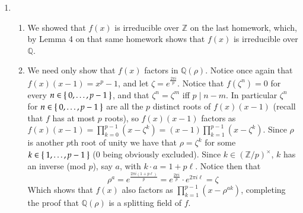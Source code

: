 \documentclass[12pt]{article}
\theoremstyle{definitionstyle}
\def\mbb#1{\mathbb{#1}}
\newcommand{\Z}{\mbb Z}
\newcommand{\Q}{\mbb Q}
\begin{document}
\begin{enumerate}[leftmargin=\labelsep]
		\item 
		\begin{enumerate}
			\item We showed that $f(x)$ is irreducible over $\Z$ on the last homework, which, by Lemma 4 on that same homework shows that $f(x)$ is irreducible over $\Q$. 
			\item We need only show that $f(x)$ factors in $\Q(\rho)$. Notice once again that $f(x)(x-1) = x^p - 1$, and let $\zeta = e^{\frac{2\pi i}{p}}$. Notice that $f(\zeta^n) = 0$ for every $n \in \Set{0, \ldots, p-1}$, and that $\zeta^n = \zeta^m$ iff $p \mid n-m$. In particular $\zeta^n$ for $n \in \Set{0, \ldots, p-1}$ are all the $p$ distinct roots of $f(x)(x-1)$ (recall that $f$ has at most $p$ roots), so $f(x)(x-1)$ factors as $f(x)(x-1) = \prod_{k=0}^{p-1} (x-\zeta^k) = (x-1)\prod_{k=1}^{p-1} (x-\zeta^k)$. Since $\rho$ is another $p$th root of unity we have that $\rho = \zeta^k$ for some $k \in \Set{1, \ldots, p-1}$ (0 being obviously excluded). Since $k \in (\Z/p)^\times$, $k$ has an inverse (mod $p$), say $a$, with $k \cdot a = 1 + p\ell$. Notice then that $$\rho^{a} = e^{\frac{2 \pi i (1+p\ell)}{p}} = e^{\frac{2\pi i}{p}} \cdot e^{2\pi i \ell} = \zeta$$
			Which shows that $f(x)$ also factors as $\prod_{k=1}^{p-1} (x-\rho^{ak})$, completing the proof that $\Q(\rho)$ is a splitting field of $f$.
		\end{enumerate}
	\end{enumerate}
\end{document}
